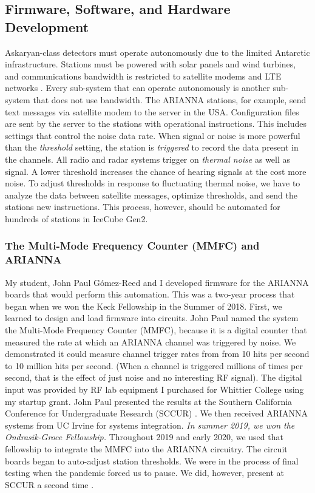 \documentclass[../../../main.tex]{subfiles}
\begin{document}
\subsection{Firmware, Software, and Hardware Development}

Askaryan-class detectors must operate autonomously due to the limited Antarctic infrastructure.  Stations must be powered with solar panels and wind turbines, and communications bandwidth is restricted to satellite modems and LTE networks \cite{10.1109/tns.2015.2468182} \cite{Aguilar_2021}.  Every sub-system that can operate autonomously is another sub-system that does not use bandwidth.  The ARIANNA stations, for example, send text messages via satellite modem to the server in the USA.  Configuration files are sent by the server to the stations with operational instructions.  This includes settings that control the noise data rate.  When signal or noise is more powerful than the \textit{threshold} setting, the station is \textit{triggered} to record the data present in the channels.  All radio and radar systems trigger on \textit{thermal noise} as well as signal.  A lower threshold increases the chance of hearing signals at the cost more noise.  To adjust thresholds in response to fluctuating thermal noise, we have to analyze the data between satellite messages, optimize thresholds, and send the stations new instructions.  This process, however, should be automated for hundreds of stations in IceCube Gen2.

\subsubsection{The Multi-Mode Frequency Counter (MMFC) and ARIANNA}

My student, John Paul G\'{o}mez-Reed and I developed firmware for the ARIANNA boards that would perform this automation.  This was a two-year process that began when we won the Keck Fellowship in the Summer of 2018. First, we learned to design and load firmware into circuits.  John Paul named the system the Multi-Mode Frequency Counter (MMFC), because it is a digital counter that measured the rate at which an ARIANNA channel was triggered by noise.  We demonstrated it could measure channel trigger rates from from 10 hits per second to 10 million hits per second.  (When a channel is triggered millions of times per second, that is the effect of just noise and no interesting RF signal).  The digital input was provided by RF lab equipment I purchased for Whittier College using my startup grant. John Paul presented the results at the Southern California Conference for Undergraduate Research (SCCUR) \cite{sccur1}.  We then received ARIANNA systems from UC Irvine for systems integration.  \textit{In summer 2019, we won the Ondrasik-Groce Fellowship.}  Throughout 2019 and early 2020, we used that fellowship to integrate the MMFC into the ARIANNA circuitry.  The circuit boards began to auto-adjust station thresholds.  We were in the process of final testing when the pandemic forced us to pause.  We did, however, present at SCCUR a second time \cite{sccur2}.
\end{document}
